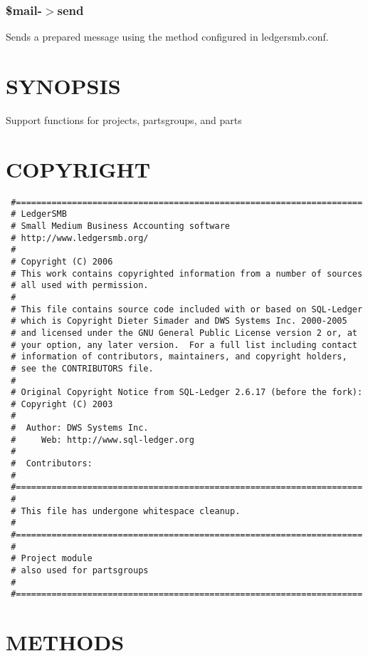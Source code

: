 \begin{description}
\begin{description}
\begin{description}
\begin{description}
\begin{description}
\subsubsection*{\$mail-$>$send\label{LedgerSMB::Mailer_Mail_output_for_LedgerSMB__mail-_send}}


Sends a prepared message using the method configured in ledgersmb.conf.

\section{SYNOPSIS\label{SYNOPSIS}}


Support functions for projects, partsgroups, and parts

\section{COPYRIGHT\label{COPYRIGHT}}
\begin{verbatim}
 #====================================================================
 # LedgerSMB
 # Small Medium Business Accounting software
 # http://www.ledgersmb.org/
 #
 # Copyright (C) 2006
 # This work contains copyrighted information from a number of sources
 # all used with permission.
 #
 # This file contains source code included with or based on SQL-Ledger
 # which is Copyright Dieter Simader and DWS Systems Inc. 2000-2005
 # and licensed under the GNU General Public License version 2 or, at
 # your option, any later version.  For a full list including contact
 # information of contributors, maintainers, and copyright holders,
 # see the CONTRIBUTORS file.
 #
 # Original Copyright Notice from SQL-Ledger 2.6.17 (before the fork):
 # Copyright (C) 2003
 #
 #  Author: DWS Systems Inc.
 #     Web: http://www.sql-ledger.org
 #
 #  Contributors:
 #
 #====================================================================
 #
 # This file has undergone whitespace cleanup.
 #
 #====================================================================
 #
 # Project module
 # also used for partsgroups
 #
 #====================================================================
\end{verbatim}
\section{METHODS\label{METHODS}}
\begin{description}


\end{description}
\end{description}
\end{description}
\end{description}
\end{description}
\end{description}
